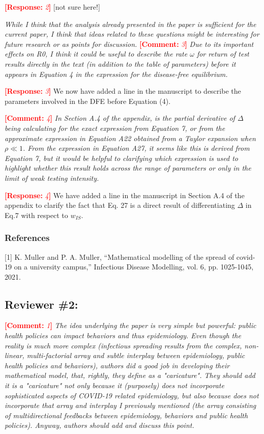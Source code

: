 \documentclass[12pt]{article}
\newcommand{\comment}{\showcomment}
\newcommand{\showcomment}[3]{\textcolor{#1}{\textbf{[#2: }\textsl{#3}\textbf{]}}}
\DeclareRobustCommand\_{\ifmmode\expandafter\subtxt\else\textunderscore\fi}
\newcommand{\com}[1]{\comment{red}{Comment}{#1}} %
\newcommand{\res}[1]{\comment{red}{Response}{#1}} %
\begin{document}
\res 2
[not sure here!] 


{\it While I think that the analysis already presented in the paper is sufficient for the current paper, I think that ideas related to these questions might be interesting for future research or as points for discussion.}
\com 3 
{\it Due to its important effects on R0, I think it could be useful to describe the rate $\omega$ for return of test results directly in the text (in addition to the table of parameters) before it appears in Equation 4 in the expression for the disease-free equilibrium.}
 
\res 3
We now have added a line in the manuscript to describe the parameters involved in the DFE before Equation (4).

\com 4
{\it In Section A.4 of the appendix, is the partial derivative of $\Delta$ being calculating for the exact expression from Equation 7, or from the approximate expression in Equation A22 obtained from a Taylor expansion when $\rho \ll 1$. From the expression in Equation A27, it seems like this is derived from Equation 7, but it would be helpful to clarifying which expression is used to highlight whether this result holds across the range of parameters or only in the limit of weak testing intensity.}

\res 4
We have added a line in the manuscript in Section A.4 of the appendix to clarify the fact that Eq. 27 is a direct result of differentiating $\Delta$ in Eq.7 with respect to $w_{IS}$.

\subsubsection*{References}

[1] K. Muller and P. A. Muller, ``Mathematical modelling of the spread of covid-19 on a university campus,'' Infectious Disease Modelling, vol. 6, pp. 1025-1045, 2021.


\subsection*{Reviewer \#2:}
\com 1 
{\it The idea underlying the paper is very simple but powerful: public health policies can impact behaviors and thus epidemiology. Even though the reality is much more complex (infectious spreading results from the complex, non-linear, multi-factorial array and subtle interplay between epidemiology, public health policies and behaviors), authors did a good job in developing their mathematical model, that, rightly, they define as a "caricature". They should add it is a "caricature" not only because it (purposely) does not incorporate sophisticated aspects of COVID-19 related epidemiology, but also because does not incorporate that array and interplay I previously mentioned (the array consisting of multidirectional feedbacks between epidemiology, behaviors and public health policies). Anyway, authors should add and discuss this point.}
\end{document}

